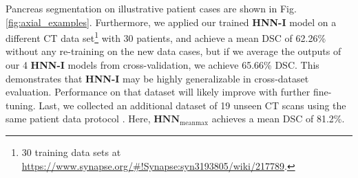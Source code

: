 \documentclass[journal]{IEEEtran}
\begin{document}
Pancreas segmentation on illustrative patient cases are shown in Fig. \ref{fig:axial_examples}. Furthermore, we applied our trained \textbf{HNN-I} model on a different CT data set\footnote{\scriptsize 30 training data sets at \url{https://www.synapse.org/\#!Synapse:syn3193805/wiki/217789}.} with 30 patients, and achieve a mean DSC of 62.26\% without any re-training on the new data cases, but if we average the outputs of our 4 \textbf{HNN-I} models from cross-validation, we achieve 65.66\% DSC. This demonstrates that \textbf{HNN-I} may be highly generalizable in cross-dataset evaluation. Performance on that dataset will likely improve with further fine-tuning. Last, we collected an additional dataset of 19 unseen CT scans using the same patient data protocol \cite{roth2015deeporgan,roth2016spatial}. Here, $\mathbf{HNN}_\mathrm{meanmax}$ achieves a mean DSC of 81.2\%.  
\end{document}
